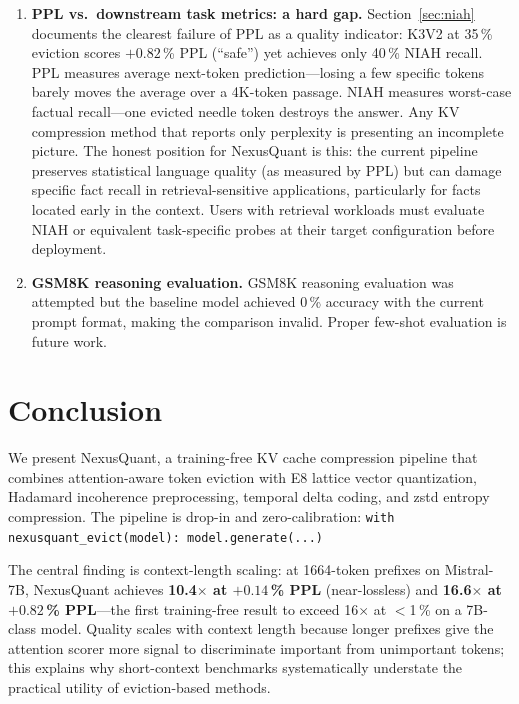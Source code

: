 \documentclass{article}
\begin{document}
\begin{enumerate}
  \item \textbf{PPL vs.\ downstream task metrics: a hard gap.}
    Section~\ref{sec:niah} documents the clearest failure of PPL as a
    quality indicator: K3V2 at 35\,\% eviction scores $+0.82$\,\% PPL
    (``safe'') yet achieves only 40\,\% NIAH recall.
    PPL measures average next-token prediction---losing a few specific tokens
    barely moves the average over a 4K-token passage.
    NIAH measures worst-case factual recall---one evicted needle token
    destroys the answer.
    Any KV compression method that reports only perplexity is presenting an
    incomplete picture.
    The honest position for NexusQuant is this: the current pipeline
    preserves statistical language quality (as measured by PPL) but can
    damage specific fact recall in retrieval-sensitive applications,
    particularly for facts located early in the context.
    Users with retrieval workloads must evaluate NIAH or equivalent
    task-specific probes at their target configuration before deployment.

  \item \textbf{GSM8K reasoning evaluation.}
    GSM8K reasoning evaluation was attempted but the baseline model achieved
    0\,\% accuracy with the current prompt format, making the comparison
    invalid.
    Proper few-shot evaluation is future work.
\end{enumerate}

\section{Conclusion}
\label{sec:conclusion}

We present NexusQuant, a training-free KV cache compression pipeline that
combines attention-aware token eviction with E8 lattice vector quantization,
Hadamard incoherence preprocessing, temporal delta coding, and zstd entropy
compression. The pipeline is drop-in and zero-calibration:
\texttt{with nexusquant\_evict(model): model.generate(...)}

The central finding is context-length scaling: at 1664-token prefixes on
Mistral-7B, NexusQuant achieves \textbf{10.4$\times$ at $+0.14$\,\% PPL}
(near-lossless) and \textbf{16.6$\times$ at $+0.82$\,\% PPL}---the first
training-free result to exceed 16$\times$ at $<$1\,\% on a 7B-class model.
Quality scales with context length because longer prefixes give the attention
scorer more signal to discriminate important from unimportant tokens; this
explains why short-context benchmarks systematically understate the practical
utility of eviction-based methods.
\end{document}
